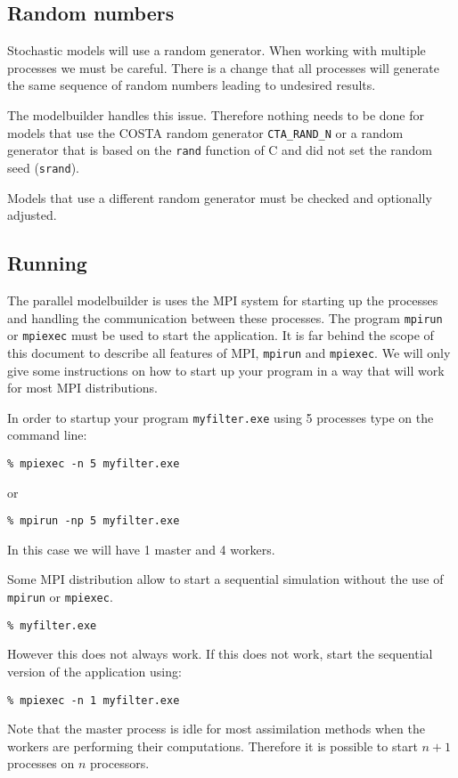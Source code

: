 \subsection{Random numbers}
Stochastic models will use a random generator. When working with multiple
processes we must be careful. There is a change that all processes will
generate the same sequence of random numbers leading to undesired results. 

The modelbuilder handles this issue. Therefore nothing needs to be done
for models that use the COSTA random generator
{\tt CTA\_RAND\_N} or a random generator that is based on the {\tt rand}
function of C and did not set the random seed ({\tt srand}).

Models that use a different random generator must be checked and optionally
adjusted.

\subsection{Running}
The parallel modelbuilder is uses the MPI system for starting up the
processes and handling the communication between these processes. The
program {\tt mpirun} or {\tt mpiexec} must be used to start the
application.  It is far behind the scope of this document to describe all
features of MPI, {\tt mpirun} and {\tt mpiexec}. We will only give some
instructions on how to start up your program in a way that will work for
most MPI distributions.

In order to startup your program {\tt myfilter.exe} using 5
processes type on the command line:
\begin{verbatim}
% mpiexec -n 5 myfilter.exe
\end{verbatim}
or 
\begin{verbatim}
% mpirun -np 5 myfilter.exe
\end{verbatim}
In this case we will have 1 master and 4 workers.

Some MPI distribution allow to start a sequential simulation without the
use of {\tt mpirun} or {\tt mpiexec}. 
\begin{verbatim}
% myfilter.exe
\end{verbatim}
However this does not always work. If this does not work, start the
sequential version of the application using:
\begin{verbatim}
% mpiexec -n 1 myfilter.exe
\end{verbatim}

Note that the master process is idle for most assimilation methods when the
workers are performing their computations. Therefore it is possible to
start $n+1$ processes on $n$ processors.

